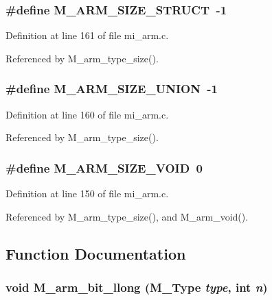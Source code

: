 \subsubsection{\setlength{\rightskip}{0pt plus 5cm}\#define M\_\-ARM\_\-SIZE\_\-STRUCT~-1}\label{mi__arm_8c_2108411f0f67db73ed58628d20c8b8c7}




Definition at line 161 of file mi\_\-arm.c.

Referenced by M\_\-arm\_\-type\_\-size().
\subsubsection{\setlength{\rightskip}{0pt plus 5cm}\#define M\_\-ARM\_\-SIZE\_\-UNION~-1}\label{mi__arm_8c_7078bb38c1b561b03958cafa198c8cb2}




Definition at line 160 of file mi\_\-arm.c.

Referenced by M\_\-arm\_\-type\_\-size().
\subsubsection{\setlength{\rightskip}{0pt plus 5cm}\#define M\_\-ARM\_\-SIZE\_\-VOID~0}\label{mi__arm_8c_ccd34ecb496e3bcdb0eded0f5f9505bf}




Definition at line 150 of file mi\_\-arm.c.

Referenced by M\_\-arm\_\-type\_\-size(), and M\_\-arm\_\-void().

\subsection{Function Documentation}
\subsubsection{\setlength{\rightskip}{0pt plus 5cm}void M\_\-arm\_\-bit\_\-llong (\bf{M\_\-Type} {\em type}, int {\em n})}\label{mi__arm_8c_ac1a7097a399199a4377705fcf357efb}




